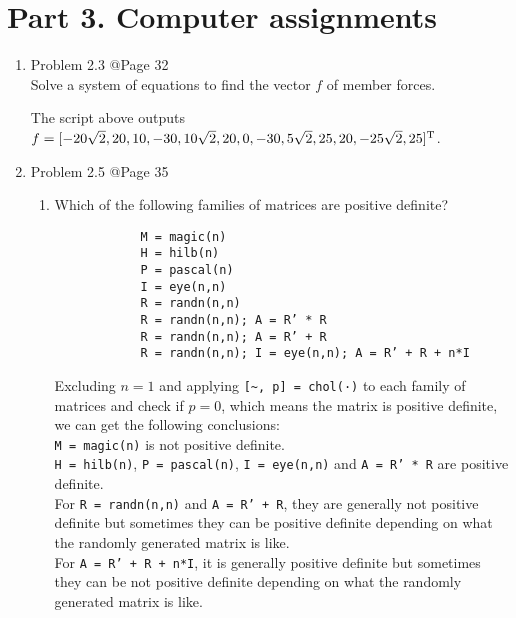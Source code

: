 \documentclass[10pt]{report}
\begin{document}
\section*{Part 3. Computer assignments}
\begin{enumerate}
	\item
	Problem 2.3 @Page 32\\
	Solve a system of equations to find the vector $f$ of member forces.
	
	The script above outputs $f = [-20\sqrt{2}, 20, 10, -30, 10\sqrt{2}, 20, 0, -30, 5\sqrt{2}, 25, 20, -25\sqrt{2}, 25]^{\rm T}$.
	
	\item 
	Problem 2.5 @Page 35
	\begin{enumerate}
		\item 
		Which of the following families of matrices are positive definite?
		\begin{verbatim}
			M = magic(n)
			H = hilb(n)
			P = pascal(n)
			I = eye(n,n)
			R = randn(n,n)
			R = randn(n,n); A = R’ * R
			R = randn(n,n); A = R’ + R
			R = randn(n,n); I = eye(n,n); A = R’ + R + n*I
		\end{verbatim}
		Excluding $n = 1$ and applying \verb|[~, p] = chol(·)| to each family of matrices and check if $p = 0$, which means the matrix is positive definite, we can get the following conclusions:\\
		\verb|M = magic(n)| is not positive definite.\\
		\verb|H = hilb(n)|, \verb|P = pascal(n)|, \verb|I = eye(n,n)| and \verb|A = R’ * R| are positive definite.\\
		For \verb|R = randn(n,n)| and \verb|A = R’ + R|, they are generally not positive definite but sometimes they can be positive definite depending on what the randomly generated matrix is like.\\
		For \verb|A = R’ + R + n*I|, it is generally positive definite but sometimes they can be not positive definite depending on what the randomly generated matrix is like.
		

\end{enumerate}
\end{enumerate}
\end{document}
